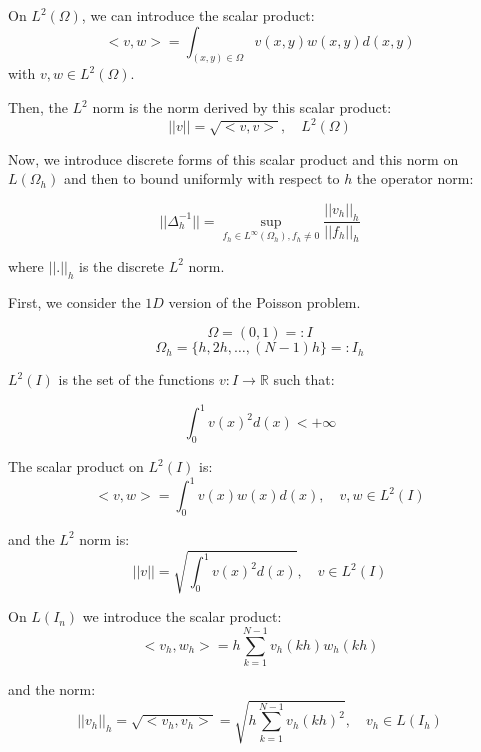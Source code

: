 On $L^2(\Omega)$, we can introduce the scalar product:
\begin{equation*}
<v, w> = \int_{(x, y) \in \Omega} v(x,y) w(x,y) d(x, y)
\end{equation*}
with $v, w \in L^2(\Omega)$.

Then, the $L^2$ norm is the norm derived by this scalar product:
\begin{equation*}
||v|| = \sqrt{<v, v>}, \quad L^2(\Omega)
\end{equation*}

Now, we introduce discrete forms of this scalar product and this norm on $L(\Omega_h)$ and then to bound uniformly with respect to $h$ the operator norm:

\begin{equation*}
|| \Delta_h^{-1} || = \sup_{f_h \in L^{\infty}(\Omega_h), f_h \neq 0} \frac{||v_h||_h}{||f_h||_h}
\end{equation*}

where $||.||_h$ is the discrete $L^2$ norm.

First, we consider the $1D$ version of the Poisson problem.

\begin{equation*}
\Omega = (0, 1) =: I
\end{equation*}
\begin{equation*}
\Omega_h = \{h, 2h, \dots, (N-1)h \} =: I_h
\end{equation*}

$L^2(I)$ is the set of the functions $v: I \rightarrow \mathbb{R}$ such that:

\begin{equation*}
\int_{0}^{1} v(x)^2 d(x) < +\infty
\end{equation*}

The scalar product on $L^2(I)$ is:
\begin{equation*}
<v, w> = \int_0^1 v(x) w(x) d(x), \quad v, w \in L^2(I)
\end{equation*}

and the $L^2$ norm is:
\begin{equation*}
||v|| = \sqrt{\int_0^1 v(x)^2 d(x)}, \quad v \in L^2(I)
\end{equation*}

On $L(I_n)$ we introduce the scalar product:
\begin{equation*}
<v_h, w_h> = h \sum_{k=1}^{N-1} v_h(k h) w_h(kh)
\end{equation*}

and the norm:
\begin{equation*}
{|| v_h ||}_h = \sqrt{<v_h, v_h>} = \sqrt{h \sum_{k=1}^{N-1} v_h(k h)^2}, \quad v_h \in L(I_h)
\end{equation*}

